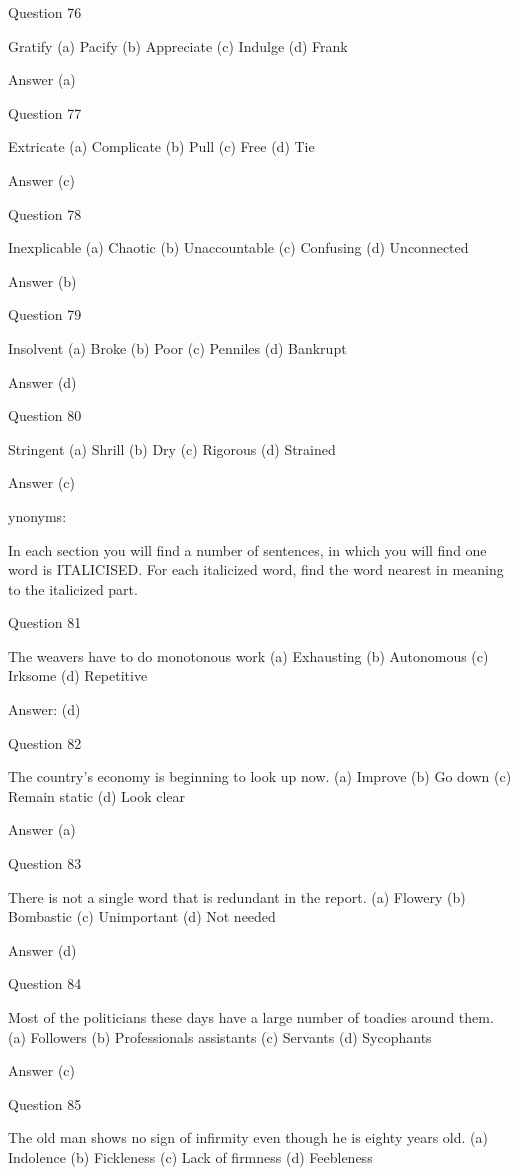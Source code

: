 Question 76

Gratify
(a) Pacify
(b) Appreciate
(c) Indulge
(d) Frank

Answer (a)

Question 77

Extricate
(a) Complicate
(b) Pull
(c) Free
(d) Tie

Answer (c)

Question 78

Inexplicable
(a) Chaotic
(b) Unaccountable
(c) Confusing
(d) Unconnected

Answer (b)

Question 79

Insolvent
(a) Broke
(b) Poor
(c) Penniles
(d) Bankrupt

Answer (d)

Question 80

Stringent
(a) Shrill
(b) Dry
(c) Rigorous
(d) Strained

Answer (c)



ynonyms:

In each section you will find a number of sentences, in which you will find one word is ITALICISED. For each italicized word, find the word nearest in meaning to the italicized part.

Question 81

The weavers have to do monotonous work
(a) Exhausting
(b) Autonomous
(c) Irksome
(d) Repetitive

Answer: (d)

Question 82

The country’s economy is beginning to look up now.
(a) Improve
(b) Go down
(c) Remain static
(d) Look clear

Answer (a)

Question 83

There is not a single word that is redundant in the report.
(a) Flowery
(b) Bombastic
(c) Unimportant
(d) Not needed

Answer (d)

Question 84

Most of the politicians these days have a large number of toadies around them.
(a) Followers
(b) Professionals assistants
(c) Servants
(d) Sycophants

Answer (c)

Question 85

The old man shows no sign of infirmity even though he is eighty years old.
(a) Indolence
(b) Fickleness
(c) Lack of firmness
(d) Feebleness


